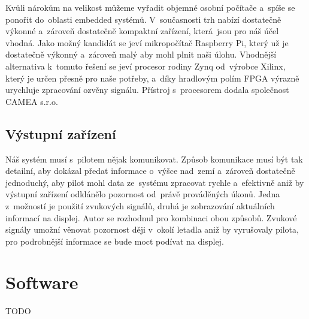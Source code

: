 			Kvůli nárokům na velikost můžeme vyřadit objemné osobní počítače a~spíše se ponořit do~oblasti embedded systémů. V~současnosti trh nabízí dostatečně výkonné a~zároveň dostatečně kompaktní zařízení, která~jsou pro náš účel vhodná. Jako možný kandidát se jeví mikropočítač Raspberry Pi, který už je dostatečně výkonný a~zároveň malý aby mohl plnit naši úlohu. Vhodnější alternativa k~tomuto řešení se jeví procesor rodiny Zynq od~výrobce Xilinx, který je určen přesně pro naše potřeby, a~díky hradlovým polím FPGA výrazně urychluje zpracování ozvěny signálu. Přístroj s~procesorem dodala společnost CAMEA s.r.o.
		
		\subsection{Výstupní zařízení}
			Náš systém musí s~pilotem nějak komunikovat. Způsob komunikace musí být tak detailní, aby dokázal předat informace o~výšce nad~zemí a~zároveň dostatečně jednoduchý, aby pilot mohl data ze~systému zpracovat rychle a~efektivně aniž by výstupní zařízení odklánělo pozornost od~právě prováděných úkonů. Jedna z~možností je použití zvukových signálů, druhá je zobrazování aktuálních informací na displej. Autor se rozhodnul pro kombinaci obou způsobů. Zvukové signály umožní věnovat pozornost ději v~okolí letadla aniž by vyrušovaly pilota, pro podrobnější informace se bude moct podívat na displej.
			
	\section{Software}\label{navrhReseni::software}
		
		TODO %
	
